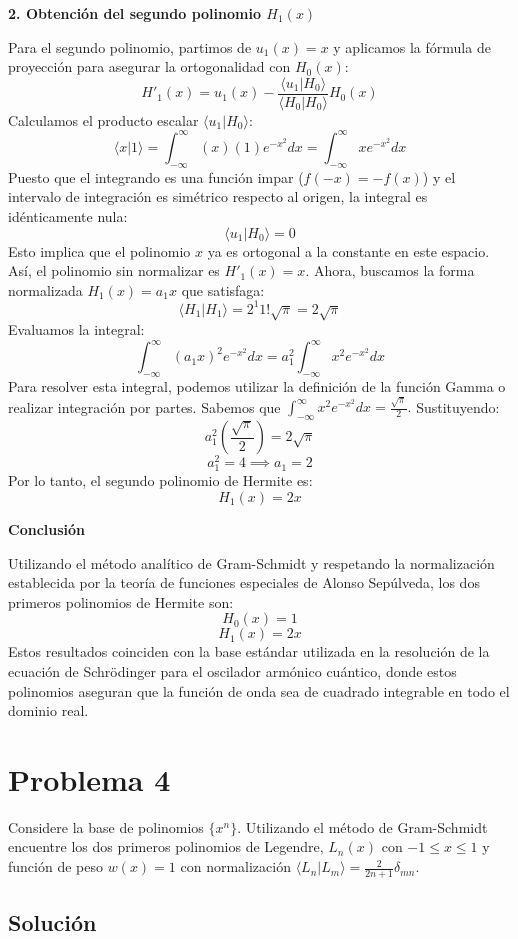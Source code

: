 \documentclass[a4paper]{article}
\begin{document}
\textbf{2. Obtención del segundo polinomio $H_1(x)$}

Para el segundo polinomio, partimos de $u_1(x) = x$ y aplicamos la fórmula de proyección para asegurar la ortogonalidad con $H_0(x):$
$$ H'_1(x) = u_1(x) - \frac{\langle u_1 | H_0 \rangle}{\langle H_0 | H_0 \rangle} H_0(x) $$
Calculamos el producto escalar $\langle u_1 | H_0 \rangle$:
$$ \langle x | 1 \rangle = \int_{-\infty}^{\infty} (x)(1)e^{-x^2} dx = \int_{-\infty}^{\infty} x e^{-x^2} dx $$
Puesto que el integrando es una función impar ($f(-x) = -f(x)$) y el intervalo de integración es simétrico respecto al origen, la integral es idénticamente nula:
$$ \langle u_1 | H_0 \rangle = 0 $$
Esto implica que el polinomio $x$ ya es ortogonal a la constante en este espacio. Así, el polinomio sin normalizar es $H'_1(x) = x.$ Ahora, buscamos la forma normalizada $H_1(x) = a_1 x$ que satisfaga:
$$ \langle H_1 | H_1 \rangle = 2^1 1! \sqrt{\pi} = 2\sqrt{\pi} $$
Evaluamos la integral:
$$ \int_{-\infty}^{\infty} (a_1 x)^2 e^{-x^2} dx = a_1^2 \int_{-\infty}^{\infty} x^2 e^{-x^2} dx $$
Para resolver esta integral, podemos utilizar la definición de la función Gamma o realizar integración por partes. Sabemos que $\int_{-\infty}^{\infty} x^2 e^{-x^2} dx = \frac{\sqrt{\pi}}{2}.$ Sustituyendo:
$$ a_1^2 \left( \frac{\sqrt{\pi}}{2} \right) = 2\sqrt{\pi} $$
$$ a_1^2 = 4 \implies a_1 = 2 $$
Por lo tanto, el segundo polinomio de Hermite es:
$$ H_1(x) = 2x $$

\textbf{Conclusión}

Utilizando el método analítico de Gram-Schmidt y respetando la normalización establecida por la teoría de funciones especiales de Alonso Sepúlveda, los dos primeros polinomios de Hermite son:
$$ H_0(x) = 1 $$
$$ H_1(x) = 2x $$
Estos resultados coinciden con la base estándar utilizada en la resolución de la ecuación de Schrödinger para el oscilador armónico cuántico, donde estos polinomios aseguran que la función de onda sea de cuadrado integrable en todo el dominio real.


\section{Problema 4}
Considere la base de polinomios $\{x^n\}$. Utilizando el método de Gram-Schmidt encuentre los dos primeros polinomios de Legendre, $L_n(x)$ con $-1 \leq x \leq 1$ y función de peso $w(x) = 1$ con normalización $\langle L_n|L_m\rangle = \frac{2}{2n+1} \delta_{mn}$.

\subsection{Solución}
\end{document}
